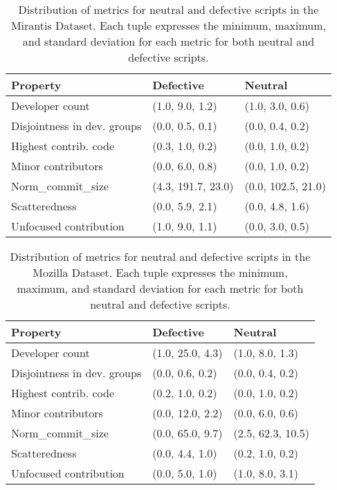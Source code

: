 \documentclass[smallextended]{svjour3}       %
\begin{document}
\begin{table*}[]
\captionsetup{justification=centering}
\caption{Distribution of metrics for neutral and defective scripts in the Mirantis Dataset. Each tuple expresses the minimum, maximum, and standard deviation for each metric for both neutral and defective scripts.} 
\label{table-rq1-dist-mir}
\footnotesize
{
\begin{tabular}{p{4.5cm} p{2.5cm} p{2.5cm}  }
\hline
\textbf{Property}  & \textbf{Defective} & \textbf{Neutral}  \\
\hline
Developer count              & (1.0, 9.0, 1.2)    &  (1.0, 3.0, 0.6)    \\ 
\hline
Disjointness in dev. groups  & (0.0, 0.5, 0.1)    &  (0.0, 0.4, 0.2)           \\ 
\hline
Highest contrib. code        & (0.3, 1.0, 0.2)    &  (0.0, 1.0, 0.2)    \\ 
\hline
Minor contributors           & (0.0, 6.0, 0.8)    &  (0.0, 1.0, 0.2)       \\ 
\hline
Norm\_commit\_size           & (4.3, 191.7, 23.0) &  (0.0, 102.5, 21.0)   \\ 
\hline
Scatteredness                & (0.0, 5.9, 2.1)    &  (0.0, 4.8, 1.6)      \\ 
\hline
Unfocused contribution       & (1.0, 9.0, 1.1)    &  (0.0, 3.0, 0.5)     \\
\hline
\end{tabular}
}
\end{table*} 

\begin{table*}[]
\captionsetup{justification=centering}
\caption{Distribution of metrics for neutral and defective scripts in the Mozilla Dataset. Each tuple expresses the minimum, maximum, and standard deviation for each metric for both neutral and defective scripts.} 
\label{table-rq1-dist-moz}
\footnotesize
{
\begin{tabular}{p{4.5cm} p{2.5cm} p{2.5cm}  }
\hline
\textbf{Property}   & \textbf{Defective} & \textbf{Neutral} \\
\hline
Developer count              & (1.0, 25.0, 4.3)  &  (1.0, 8.0, 1.3)   \\ 
\hline
Disjointness in dev. groups  & (0.0, 0.6, 0.2)   &  (0.0, 0.4, 0.2)         \\ 
\hline
Highest contrib. code        & (0.2, 1.0, 0.2)   &  (0.0, 1.0, 0.2)   \\ 
\hline
Minor contributors           & (0.0, 12.0, 2.2)  &  (0.0, 6.0, 0.6)      \\ 
\hline
Norm\_commit\_size           &  (0.0, 65.0, 9.7) & (2.5, 62.3, 10.5)      \\ 
\hline
Scatteredness                &  (0.0, 4.4, 1.0)  & (0.2, 1.0, 0.2)         \\ 
\hline
Unfocused contribution       &  (0.0, 5.0, 1.0)  & (1.0, 8.0, 3.1)     \\
\hline
\end{tabular}
}
\end{table*} 
\end{document}
